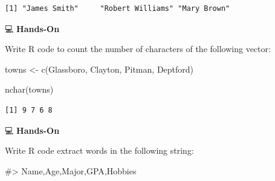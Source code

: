 \documentclass[
  letterpaper,
  DIV=11,
  numbers=noendperiod]{scrreprt}
\newenvironment{Shaded}{\begin{snugshade}}{\end{snugshade}}
\newcommand{\CommentTok}[1]{\textcolor[rgb]{0.37,0.37,0.37}{#1}}
\newcommand{\FunctionTok}[1]{\textcolor[rgb]{0.28,0.35,0.67}{#1}}
\newcommand{\NormalTok}[1]{\textcolor[rgb]{0.00,0.23,0.31}{#1}}
\newcommand{\OtherTok}[1]{\textcolor[rgb]{0.00,0.23,0.31}{#1}}
\newcommand{\StringTok}[1]{\textcolor[rgb]{0.13,0.47,0.30}{#1}}
\begin{document}
\begin{verbatim}
[1] "James Smith"     "Robert Williams" "Mary Brown"     
\end{verbatim}

💻 \textbf{Hands-On}

Write R code to count the number of characters of the following vector:

\begin{Shaded}
\begin{Highlighting}[]
\NormalTok{towns }\OtherTok{\textless{}{-}} \FunctionTok{c}\NormalTok{(}\StringTok{\textquotesingle{}Glassboro\textquotesingle{}}\NormalTok{, }\StringTok{\textquotesingle{}Clayton\textquotesingle{}}\NormalTok{, }\StringTok{\textquotesingle{}Pitman\textquotesingle{}}\NormalTok{, }\StringTok{\textquotesingle{}Deptford\textquotesingle{}}\NormalTok{)}
\end{Highlighting}
\end{Shaded}

\begin{tcolorbox}[enhanced jigsaw, colbacktitle=quarto-callout-tip-color!10!white, opacitybacktitle=0.6, breakable, left=2mm, leftrule=.75mm, toprule=.15mm, toptitle=1mm, bottomtitle=1mm, colframe=quarto-callout-tip-color-frame, opacityback=0, coltitle=black, arc=.35mm, titlerule=0mm, colback=white, bottomrule=.15mm, title=\textcolor{quarto-callout-tip-color}{\faLightbulb}\hspace{0.5em}{Answer}, rightrule=.15mm]

\begin{Shaded}
\begin{Highlighting}[]
\FunctionTok{nchar}\NormalTok{(towns)}
\end{Highlighting}
\end{Shaded}

\begin{verbatim}
[1] 9 7 6 8
\end{verbatim}

\end{tcolorbox}

💻 \textbf{Hands-On}

Write R code extract words in the following string:

\begin{Shaded}
\begin{Highlighting}[]
\CommentTok{\#\textgreater{} \textquotesingle{}Name,Age,Major,GPA,Hobbies\textquotesingle{}}
\end{Highlighting}
\end{Shaded}
\end{document}
